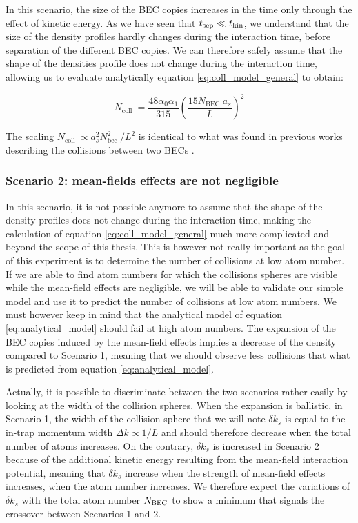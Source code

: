 In this scenario, the size of the BEC copies increases in the time only through the effect of kinetic energy. As we have seen that $t_{\rm{sep}} \ll t_{\rm{kin}}$, we understand that the size of the density profiles hardly changes during the interaction time, \ie before separation of the different BEC copies. We can therefore safely assume that the shape of the densities profile does not change during the interaction time, allowing us to evaluate analytically equation \ref{eq:coll_model_general} to obtain:

\begin{equation}
    N_{\text {coll }}=\frac{48 \alpha_{0} \alpha_{1}}{315}\left(\frac{15 N_{\text {BEC }} a_{s}}{L}\right)^{2}
    \label{eq:analytical_model}
\end{equation}

\noindent The scaling $N_{\text {coll }} \propto a_{s}^{2} N_{\text {bec }}^{2} / L^{2}$ is identical to what was found in previous works describing the collisions between two BECs \cite{zin2005quantum,zin2006elastic}. 

\subsubsection{Scenario 2: mean-fields effects are not negligible}

In this scenario, it is not possible anymore to assume that the shape of the density profiles does not change during the interaction time, making the calculation of equation \ref{eq:coll_model_general} much more complicated and beyond the scope of this thesis. This is however not really important as the goal of this experiment is to determine the number of collisions at low atom number. If we are able to find atom numbers for which the collisions spheres are visible while the mean-field effects are negligible, we will be able to validate our simple model and use it to predict the number of collisions at low atom numbers. We must however keep in mind that the analytical model of equation \ref{eq:analytical_model} should fail at high atom numbers. The expansion of the BEC copies induced by the mean-field effects implies a decrease of the density compared to Scenario 1, meaning that we should observe less collisions that what is predicted from equation \ref{eq:analytical_model}.

Actually, it is possible to discriminate between the two scenarios rather easily by looking at the width of the collision spheres. When the expansion is ballistic, \ie in Scenario 1, the width of the collision sphere that we will note $\delta k_s$ is equal to the in-trap momentum width $\Delta k \propto 1/L$ and should therefore decrease when the total number of atoms increases. On the contrary, $\delta k_s$ is increased in Scenario 2 because of the additional kinetic energy resulting from the mean-field interaction potential, meaning that $\delta k_s$ increase when the strength of mean-field effects increases, \ie when the atom number increases. We therefore expect the variations of $\delta k_s$ with the total atom number $N_{\rm{BEC}}$ to show a minimum that signals the crossover between Scenarios 1 and 2.

